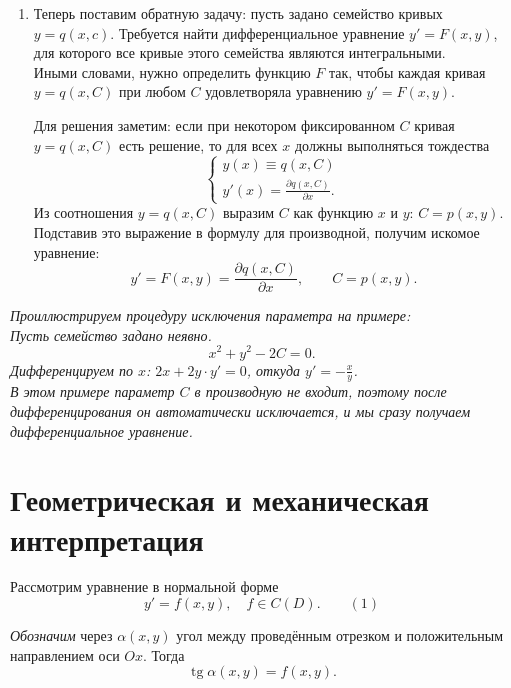 \documentclass[12pt,a4paper]{report}
\begin{document}
{\begin{enumerate}
    \item Теперь поставим обратную задачу: пусть задано семейство кривых $y=q(x,c)$. Требуется найти дифференциальное уравнение $y'=F(x,y)$, для которого все кривые этого семейства являются интегральными. \\
    Иными словами, нужно определить функцию $F$ так, чтобы каждая кривая $y=q(x,C)$ при любом $C$ удовлетворяла уравнению $y'=F(x,y)$.

    Для решения заметим: если при некотором фиксированном $C$ кривая $y=q(x,C)$ есть решение, то для всех $x$ должны выполняться тождества
    \[
    \begin{cases}
        y(x)\equiv q(x,C)\,\\
        y'(x)=\frac{\partial q(x,C)}{\partial x}.
    \end{cases}
    \]
    Из соотношения $y=q(x,C)$ выразим $C$ как функцию $x$ и $y$: $C=p(x,y)$. Подставив это выражение в формулу для производной, получим искомое уравнение:
    \[
    y'=F(x,y)=\frac{\partial q(x,C)}{\partial x},\qquad C=p(x,y).
    \]

\end{enumerate}

    \textit{Проиллюстрируем процедуру исключения параметра на примере: \\
    Пусть семейство задано неявно.
    \[
    x^2+y^2-2C=0.
    \]
    Дифференцируем по $x$: $2x+2y\cdot y'=0$, откуда $y'=-\frac{x}{y}$. \\
    В этом примере параметр $C$ в производную не входит, поэтому после дифференцирования он автоматически исключается, и мы сразу получаем дифференциальное уравнение.}

}

\section{Геометрическая и механическая интерпретация}

Рассмотрим уравнение в нормальной форме
\[
y'=f(x,y),\quad f\in C(D).\qquad (1)
\]


\noindent
\textit{Обозначим} через \(\alpha(x,y)\) угол между проведённым отрезком и положительным направлением оси \(Ox\). Тогда
\[
\operatorname{tg}\alpha(x,y)=f(x,y).
\]
\end{document}
